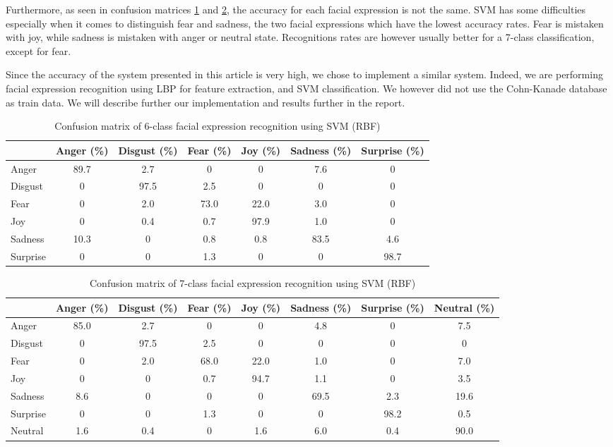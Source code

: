 \noindent Furthermore, as seen in confusion matrices \ref{conf_mtx_6_svm_lbp} and \ref{conf_mtx_7_svm_lbp}, the accuracy for each facial expression is not the same. SVM has some difficulties especially when it comes to distinguish fear and sadness, the two facial expressions which have the lowest accuracy rates. Fear is mistaken with joy, while sadness is mistaken with anger or neutral state. Recognitions rates are however usually better for a 7-class classification, except for fear.
\newline

\noindent Since the accuracy of the system presented in this article is very high, we chose to implement a similar system. Indeed, we are performing facial expression recognition using LBP for feature extraction, and SVM classification. We however did not use the Cohn-Kanade database as train data. We will describe further our implementation and results further in the report. 
\newline

\begin{table}[h]
\begin{tabular}{|lcccccc|}
\hline
 & Anger (\%) & Disgust (\%) & Fear (\%) & Joy (\%) & Sadness (\%) & Surprise (\%) \\
\hline
Anger & 89.7 & 2.7 & 0 & 0 & 7.6 & 0 \\
Disgust & 0 & 97.5 & 2.5 & 0 & 0 & 0 \\
Fear & 0 & 2.0 & 73.0 & 22.0 & 3.0 & 0 \\
Joy & 0 & 0.4 & 0.7 & 97.9 & 1.0 & 0 \\
Sadness & 10.3 & 0 & 0.8 & 0.8 & 83.5 & 4.6 \\
Surprise & 0 & 0 & 1.3 & 0 & 0 & 98.7 \\
\hline
\end{tabular}
\caption{\label{conf_mtx_6_svm_lbp} Confusion matrix of 6-class facial expression recognition using SVM (RBF)}
\end{table}

\vspace{\baselineskip}

\begin{table}[h]
\begin{tabular}{|lccccccc|}
\hline
& Anger (\%) & Disgust (\%) & Fear (\%) & Joy (\%) & Sadness (\%) & Surprise (\%) & Neutral (\%) \\
\hline
Anger & 85.0 & 2.7 & 0 & 0 & 4.8 & 0 & 7.5 \\
Disgust & 0 & 97.5 & 2.5 & 0 & 0 & 0 & 0 \\
Fear & 0 & 2.0 & 68.0 & 22.0 & 1.0 & 0 & 7.0 \\
Joy & 0 & 0 & 0.7 & 94.7  & 1.1 & 0 & 3.5 \\
Sadness & 8.6 & 0 & 0 & 0 & 69.5 & 2.3 & 19.6 \\
Surprise & 0 & 0 & 1.3 & 0 & 0 & 98.2 & 0.5 \\
Neutral & 1.6 & 0.4 & 0 & 1.6 & 6.0 & 0.4 & 90.0 \\
\hline
\end{tabular}
\caption{\label{conf_mtx_7_svm_lbp} Confusion matrix of 7-class facial expression recognition using SVM (RBF)}
\end{table}
